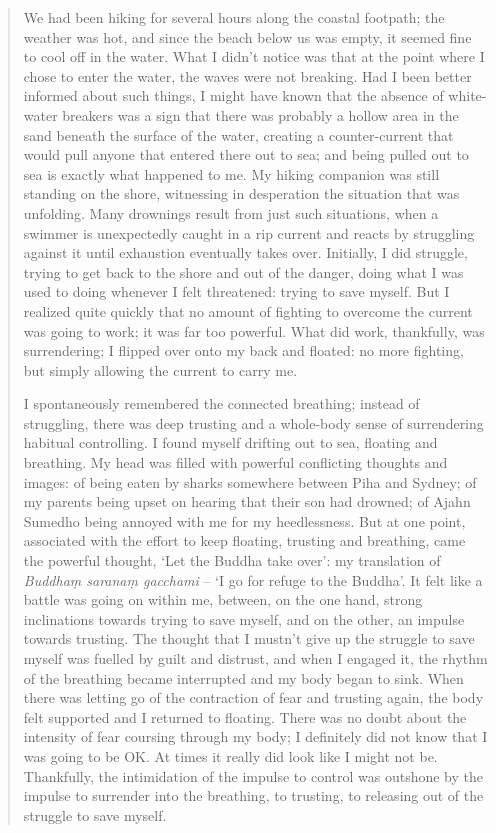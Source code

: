 \begin{quotation}
We had been hiking for several hours along the coastal footpath; the
weather was hot, and since the beach below us was empty, it seemed fine
to cool off in the water. What I didn't notice was that at the point
where I chose to enter the water, the waves were not breaking. Had I
been better informed about such things, I might have known that the
absence of white-water breakers was a sign that there was probably a
hollow area in the sand beneath the surface of the water, creating a
counter-current that would pull anyone that entered there out to sea;
and being pulled out to sea is exactly what happened to me. My hiking
companion was still standing on the shore, witnessing in desperation the
situation that was unfolding. Many drownings result from just such
situations, when a swimmer is unexpectedly caught in a rip current and
reacts by struggling against it until exhaustion eventually takes over.
Initially, I did struggle, trying to get back to the shore and out of
the danger, doing what I was used to doing whenever I felt threatened:
trying to save myself. But I realized quite quickly that no amount of
fighting to overcome the current was going to work; it was far too
powerful. What did work, thankfully, was surrendering; I flipped over
onto my back and floated: no more fighting, but simply allowing the
current to carry me.

I spontaneously remembered the connected breathing; instead of
struggling, there was deep trusting and a whole-body sense of
surrendering habitual controlling. I found myself drifting out to sea,
floating and breathing. My head was filled with powerful conflicting
thoughts and images: of being eaten by sharks somewhere between Piha and
Sydney; of my parents being upset on hearing that their son had drowned;
of Ajahn Sumedho being annoyed with me for my heedlessness. But at one
point, associated with the effort to keep floating, trusting and
breathing, came the powerful thought, `Let the Buddha take over': my
translation of \emph{Buddhaṃ saranaṃ gacchami} -- `I go for refuge to
the Buddha'. It felt like a battle was going on within me, between, on
the one hand, strong inclinations towards trying to save myself, and on
the other, an impulse towards trusting. The thought that I mustn't give
up the struggle to save myself was fuelled by guilt and distrust, and
when I engaged it, the rhythm of the breathing became interrupted and my
body began to sink. When there was letting go of the contraction of fear
and trusting again, the body felt supported and I returned to floating.
There was no doubt about the intensity of fear coursing through my body;
I definitely did not know that I was going to be OK. At times it really
did look like I might not be. Thankfully, the intimidation of the
impulse to control was outshone by the impulse to surrender into the
breathing, to trusting, to releasing out of the struggle to save myself.


\end{quotation}
